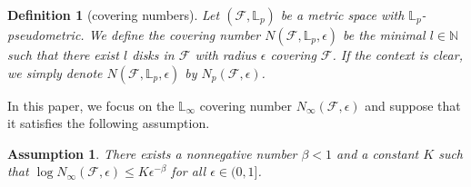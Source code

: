 \documentclass[letterpaper]{article} %
\newtheorem{definition}{Definition}
\newtheorem{assumption}{Assumption}
\newcommand{\real}{\mathbb{R}}
\newcommand{\lnorm}{\mathbb{L}}
\newcommand{\complexbound}{\beta}
\newcommand{\red}[1]{\textcolor{red}{#1}}
\newcommand{\todo}[1]{\red{\textsc{todo:} #1}}
\begin{document}
\begin{definition}[covering numbers]
Let $(\mathcal{F}, \lnorm{}_p)$ be a metric space with $\lnorm{}_p$-pseudometric. We define the covering number $N(\mathcal{F},\lnorm{}_p,\epsilon)$ be the minimal $l\in\mathbb{N}$ such that there exist $l$ disks in $\mathcal{F}$ with radius $\epsilon$ covering $\mathcal{F}$. If the context is clear, we simply denote $N(\mathcal{F},\lnorm{}_p, \epsilon)$ by $N_p(\mathcal{F},\epsilon)$.


\end{definition}

In this paper, we focus on the $\lnorm_\infty$ covering number $N_\infty(\mathcal{F},\epsilon)$ and suppose that it satisfies the following assumption.

\begin{assumption}\label{ass:covering_number} 
There exists a nonnegative number $\complexbound < 1$ and a constant $K$ such that $\log N_\infty(\mathcal{F},\epsilon) \le K\epsilon^{-\complexbound}$ for all $\epsilon\in (0,1]$. 
\end{assumption}
\end{document}

